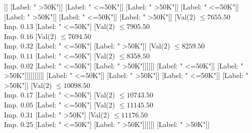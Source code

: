 \documentclass[margin=10pt]{standalone}
\begin{document}
\begin{forest}
																																																			[Label: " >50K"]
																																																			[Label: " <=50K"]]]
																																																	[Label: " >50K"]]
																																																[Label: " <=50K"]]
																																															[Label: " >50K"]]
																																														[Label: " <=50K"]]
																																													[Label: " >50K"]]
																																												[Label: " <=50K"]]
																																											[Label: " >50K"]]
																																										[Val($2$) $ \leq 7655.50$ \\ Imp. $0.13$
																																											[Label: " <=50K"]
																																											[Val($2$) $ \leq 7905.50$ \\ Imp. $0.16$
																																												[Val($2$) $ \leq 7694.50$ \\ Imp. $0.32$
																																													[Label: " <=50K"]
																																													[Label: " >50K"]]
																																												[Val($2$) $ \leq 8259.50$ \\ Imp. $0.11$
																																													[Label: " <=50K"]
																																													[Val($2$) $ \leq 8358.50$ \\ Imp. $0.02$
																																														[Label: " <=50K"]
																																														[Label: " >50K"]]]]]]
																																									[Label: " <=50K"]]
																																								[Label: " >50K"]]]]]]]]]]
																															[Label: " <=50K"]]
																														[Label: " >50K"]]
																													[Label: " <=50K"]]
																												[Label: " >50K"]]
																											[Val($2$) $ \leq 10098.50$ \\ Imp. $0.17$
																												[Label: " <=50K"]
																												[Val($2$) $ \leq 10743.50$ \\ Imp. $0.05$
																													[Label: " <=50K"]
																													[Val($2$) $ \leq 11145.50$ \\ Imp. $0.31$
																														[Label: " >50K"]
																														[Val($2$) $ \leq 11176.50$ \\ Imp. $0.25$
																															[Label: " <=50K"]
																															[Label: " >50K"]]]]]]
																										[Label: " >50K"]]

\end{forest}
\end{document}
